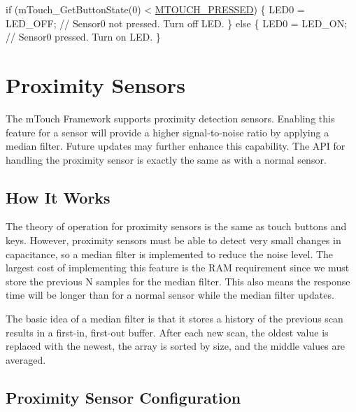 \begin{DoxyCode}
\textcolor{keywordflow}{if} (mTouch\_GetButtonState(0) < \hyperlink{m_touch_cap_2_p_i_c12_f_01_p_i_c16_f_01_library_2m_touch_8h_a7d72b112c35bc51408030eb7ecdcacd2aed5b3f2b7065991010f45eb04759ef01}{MTOUCH\_PRESSED})
\{ 
    LED0 = LED\_OFF;                     \textcolor{comment}{// Sensor0 not pressed. Turn off LED.}
\} \textcolor{keywordflow}{else} \{ 
    LED0 = LED\_ON;                      \textcolor{comment}{// Sensor0 pressed. Turn on LED.}
\}
\end{DoxyCode}
 \hypertarget{featProximity}{}\section{Proximity Sensors}\label{featProximity}
The m\+Touch Framework supports proximity detection sensors. Enabling this feature for a sensor will provide a higher signal-\/to-\/noise ratio by applying a median filter. Future updates may further enhance this capability. The A\+P\+I for handling the proximity sensor is exactly the same as with a normal sensor.\hypertarget{feat_proximity_featProx-How}{}\subsection{How It Works}\label{feat_proximity_featProx-How}
The theory of operation for proximity sensors is the same as touch buttons and keys. However, proximity sensors must be able to detect very small changes in capacitance, so a median filter is implemented to reduce the noise level. The largest cost of implementing this feature is the R\+A\+M requirement since we must store the previous N samples for the median filter. This also means the response time will be longer than for a normal sensor while the median filter updates.

The basic idea of a median filter is that it stores a history of the previous scan results in a first-\/in, first-\/out buffer. After each new scan, the oldest value is replaced with the newest, the array is sorted by size, and the middle values are averaged.

 \hypertarget{feat_proximity_featProx-Config}{}\subsection{Proximity Sensor Configuration}\label{feat_proximity_featProx-Config}

